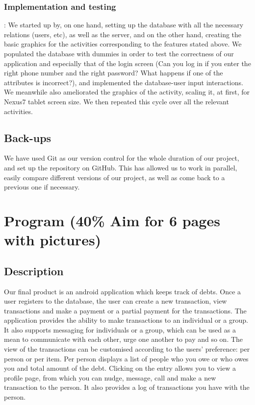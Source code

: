 \documentclass[a4paper,11pt]{article}
\begin{document}
\subsubsection*{Implementation and testing}:
We started up by, on one hand, setting up the database with all the necessary relations (users, etc), as well as the server, and on the other hand, creating the basic graphics for the activities corresponding to the features stated above. We populated the database with dummies in order to test the correctness of our application and especially that of the login screen (Can you log in if you enter the right phone number and the right password? What happens if one of the attributes is incorrect?), and implemented the database-user input interactions. We meanwhile also ameliorated the graphics of the activity, scaling it, at first, for Nexus7 tablet screen size. We then repeated this cycle over all the relevant activities.


\subsection*{Back-ups}
We have used Git as our version control for the whole duration of our project, and set up the repository on GitHub. This has allowed us to work in parallel, easily compare different versions of our project, as well as come back to a previous one if necessary.


\section*{Program (40\% Aim for 6 pages with pictures)}
\subsection*{Description}
Our final product is an android application which keeps track of debts. Once a user registers to the database, the user can create a new transaction, view transactions and make a payment or a partial payment for the transactions. The application provides the ability to make transactions to an individual or a group. It also supports messaging for individuals or a group, which can be used as a mean to communicate with each other, urge one another to pay and so on. The view of the transactions can be customised according to the users’ preference: per person or per item. Per person displays a list of people who you owe or who owes you and total amount of the debt. Clicking on the entry allows you to view a profile page, from which you can nudge, message, call and make a new transaction to the person. It also provides a log of transactions you have with the person.
\end{document}
